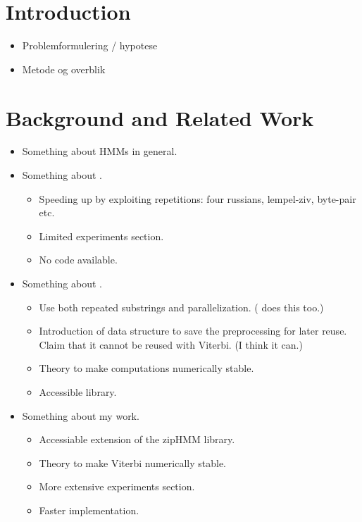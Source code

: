\documentclass[oneside,a4,danish,english,report]{memoir}
\begin{document}
\tableofcontents

\mainmatter{}

\chapter{Introduction}
\label{cha:introduction}

\begin{itemize}
\item Problemformulering / hypotese
\item Metode og overblik
\end{itemize}

\chapter{Background and Related Work}
\label{cha:backgr-relat-work}

\begin{itemize}
\item Something about HMMs in general.
\item Something about \citet{lifshits2009speeding}.
  \begin{itemize}
  \item Speeding up by exploiting repetitions: four russians, lempel-ziv,
    byte-pair etc.
  \item Limited experiments section.
  \item No code available.
  \end{itemize}
\item Something about \citet{sand2013ziphmmlib}.
  \begin{itemize}
  \item Use both repeated substrings and
    parallelization. (\citet{lifshits2009speeding} does this too.)
  \item Introduction of data structure to save the preprocessing for later
    reuse. Claim that it cannot be reused with Viterbi. (I think it can.)
  \item Theory to make computations numerically stable.
  \item Accessible library.
  \end{itemize}
\item Something about my work.
  \begin{itemize}
  \item Accessiable extension of the zipHMM library.
  \item Theory to make Viterbi numerically stable.
  \item More extensive experiments section.
  \item Faster implementation.
  \end{itemize}
\end{itemize}
\end{document}
